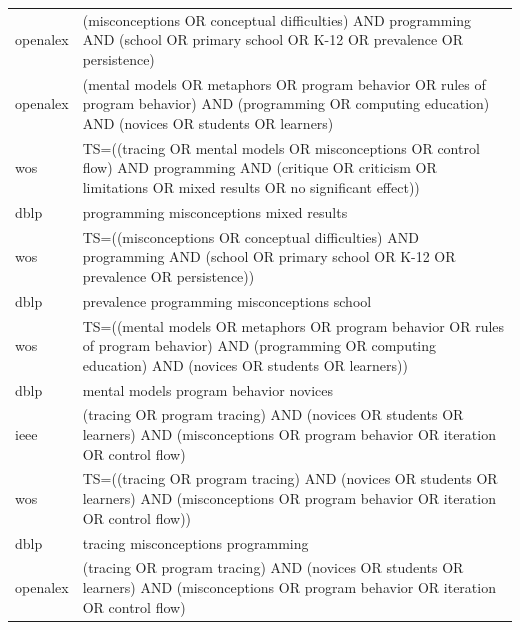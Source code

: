\documentclass{article}
\begin{document}
\begin{longtable}{lp{10cm}}
openalex & (misconceptions OR \textquotedbl{}conceptual difficulties\textquotedbl{}) AND programming AND (school OR \textquotedbl{}primary school\textquotedbl{} OR K-12 OR prevalence OR persistence) \\
openalex & (\textquotedbl{}mental models\textquotedbl{} OR metaphors OR \textquotedbl{}program behavior\textquotedbl{} OR \textquotedbl{}rules of program behavior\textquotedbl{}) AND (programming OR \textquotedbl{}computing education\textquotedbl{}) AND (novices OR students OR learners) \\
wos & TS=((tracing OR \textquotedbl{}mental models\textquotedbl{} OR misconceptions OR \textquotedbl{}control flow\textquotedbl{}) AND programming AND (critique OR criticism OR limitations OR \textquotedbl{}mixed results\textquotedbl{} OR \textquotedbl{}no significant effect\textquotedbl{})) \\
dblp & programming misconceptions mixed results \\
wos & TS=((misconceptions OR \textquotedbl{}conceptual difficulties\textquotedbl{}) AND programming AND (school OR \textquotedbl{}primary school\textquotedbl{} OR K-12 OR prevalence OR persistence)) \\
dblp & prevalence programming misconceptions school \\
wos & TS=((\textquotedbl{}mental models\textquotedbl{} OR metaphors OR \textquotedbl{}program behavior\textquotedbl{} OR \textquotedbl{}rules of program behavior\textquotedbl{}) AND (programming OR \textquotedbl{}computing education\textquotedbl{}) AND (novices OR students OR learners)) \\
dblp & mental models program behavior novices \\
ieee & (tracing OR \textquotedbl{}program tracing\textquotedbl{}) AND (novices OR students OR learners) AND (misconceptions OR \textquotedbl{}program behavior\textquotedbl{} OR iteration OR \textquotedbl{}control flow\textquotedbl{}) \\
wos & TS=((tracing OR \textquotedbl{}program tracing\textquotedbl{}) AND (novices OR students OR learners) AND (misconceptions OR \textquotedbl{}program behavior\textquotedbl{} OR iteration OR \textquotedbl{}control flow\textquotedbl{})) \\
dblp & tracing misconceptions programming \\
openalex & (tracing OR \textquotedbl{}program tracing\textquotedbl{}) AND (novices OR students OR learners) AND (misconceptions OR \textquotedbl{}program behavior\textquotedbl{} OR iteration OR \textquotedbl{}control flow\textquotedbl{}) \\

\end{longtable}
\end{document}
